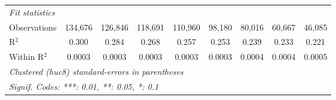 \begin{tabular}{lcccccccc}
   \midrule
   \emph{Fit statistics}\\
   Observations                 & 134,676                  & 126,846                  & 118,691                  & 110,960                  & 98,180                   & 80,016                   & 60,667                   & 46,085\\  
   R$^2$                        & 0.300                    & 0.284                    & 0.268                    & 0.257                    & 0.253                    & 0.239                    & 0.233                    & 0.221\\  
   Within R$^2$                 & 0.0003                   & 0.0003                   & 0.0003                   & 0.0003                   & 0.0003                   & 0.0004                   & 0.0004                   & 0.0005\\  
   \midrule \midrule
   \multicolumn{9}{l}{\emph{Clustered (huc8) standard-errors in parentheses}}\\
   \multicolumn{9}{l}{\emph{Signif. Codes: ***: 0.01, **: 0.05, *: 0.1}}\\
\end{tabular}
\par\endgroup


